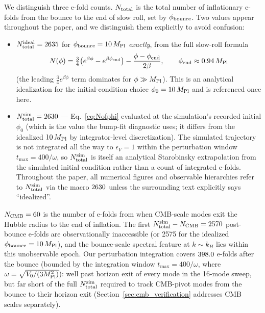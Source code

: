 \documentclass[11pt,a4paper]{article}
\begin{document}
We distinguish three e-fold counts.  $N_{\rm total}$ is the total number of inflationary e-folds from the bounce to the end of slow roll, set by $\phi_{\rm bounce}$.  Two values appear throughout the paper, and we distinguish them explicitly to avoid confusion:
\begin{itemize}
  \item $N_{\rm total}^{\rm ideal} = 2635$ for $\phi_{\rm bounce} = 10\,M_{\rm Pl}$ \emph{exactly}, from the full slow-roll formula
  \begin{equation}
    N(\phi) = \tfrac{3}{4}\bigl(e^{\beta\phi} - e^{\beta\phi_{\rm end}}\bigr) - \frac{\phi - \phi_{\rm end}}{2\beta}, \qquad \phi_{\rm end} \approx 0.94\,M_{\rm Pl}
    \label{eq:Nofphi}
  \end{equation}
  (the leading $\tfrac{3}{4}e^{\beta\phi}$ term dominates for $\phi \gg M_{\rm Pl}$).  This is an analytical idealization for the initial-condition choice $\phi_0 = 10\,M_{\rm Pl}$ and is referenced once here.
  \item $N_{\rm total}^{\rm sim} = 2630$ --- Eq.~\eqref{eq:Nofphi} evaluated at the simulation's recorded initial $\phi_0$ (which is the value the bump-fit diagnostic uses; it differs from the idealized $10\,M_{\rm Pl}$ by integrator-level discretization). The simulated trajectory is not integrated all the way to $\epsilon_V = 1$ within the perturbation window $t_{\max} = 400/\omega$, so $N_{\rm total}^{\rm sim}$ is itself an analytical Starobinsky extrapolation from the simulated initial condition rather than a count of integrated e-folds. Throughout the paper, all numerical figures and observable hierarchies refer to $N_{\rm total}^{\rm sim}$ via the macro $2630$ unless the surrounding text explicitly says ``idealized''.
\end{itemize}
$N_{\rm CMB} = 60$ is the number of e-folds from when CMB-scale modes exit the Hubble radius to the end of inflation.  The first $N_{\rm total}^{\rm sim} - N_{\rm CMB} = 2570$ post-bounce e-folds are observationally inaccessible (or 2575 for the idealized $\phi_{\rm bounce}=10\,M_{\rm Pl}$), and the bounce-scale spectral feature at $k \sim k_H$ lies within this unobservable epoch.  Our perturbation integration covers $398.0$ e-folds after the bounce (bounded by the integration window $t_{\max} = 400/\omega$, where $\omega = \sqrt{V_0/(3M_{\rm Pl}^2)}$): well past horizon exit of every mode in the 16-mode sweep, but far short of the full $N_{\rm total}^{\rm sim}$ required to track CMB-pivot modes from the bounce to their horizon exit (Section~\ref{sec:cmb_verification} addresses CMB scales separately).
\end{document}
